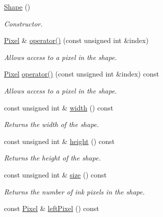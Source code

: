 \begin{CompactItemize}
\item 
\hyperlink{class_shape_aa8d87171e65e0d8ba3c5459978992a7}{Shape} ()
\begin{CompactList}\small\item\em Constructor. \item\end{CompactList}\item 
\hyperlink{_pixel_8hpp_535e59456e3e633842529cfa8ea103c4}{Pixel} \& \hyperlink{class_shape_7d12f3a76e2bfb7963c00237eba41e0a}{operator()} (const unsigned int \&index)
\begin{CompactList}\small\item\em Allows access to a pixel in the shape. \item\end{CompactList}\item 
\hyperlink{_pixel_8hpp_535e59456e3e633842529cfa8ea103c4}{Pixel} \hyperlink{class_shape_79caae3047826779e0c8094e9882843b}{operator()} (const unsigned int \&index) const 
\begin{CompactList}\small\item\em Allows access to a pixel in the shape. \item\end{CompactList}\item 
const unsigned int \& \hyperlink{class_shape_6773dfedb96ef750e5469e22d51ecf0f}{width} () const 
\begin{CompactList}\small\item\em Returns the width of the shape. \item\end{CompactList}\item 
const unsigned int \& \hyperlink{class_shape_8400155046b2190bce621f8f366ef2be}{height} () const 
\begin{CompactList}\small\item\em Returns the height of the shape. \item\end{CompactList}\item 
const unsigned int \& \hyperlink{class_shape_8504d3be338d2fa594c35fe1444a9ed8}{size} () const 
\begin{CompactList}\small\item\em Returns the number of ink pixels in the shape. \item\end{CompactList}\item 
const \hyperlink{_pixel_8hpp_535e59456e3e633842529cfa8ea103c4}{Pixel} \& \hyperlink{class_shape_53d49d362234068aad0b80986fabb85d}{leftPixel} () const 

\end{CompactItemize}
